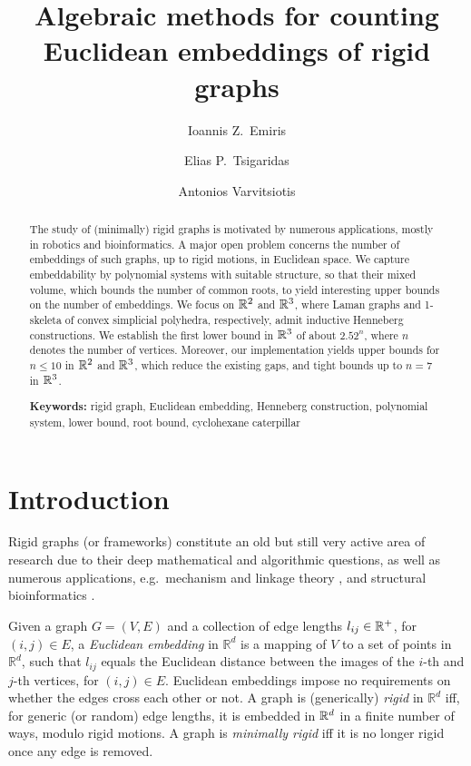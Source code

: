 \documentclass[envcountsame]{llncs}
\title{Algebraic methods for counting Euclidean embeddings of rigid graphs}
\author{Ioannis Z.\ Emiris \inst{1} \and  Elias P.\ Tsigaridas\inst{2} \and
  Antonios Varvitsiotis\inst{1} }
\institute{
  National and Kapodistrian University of Athens, Greece. \and INRIA     M\'editerran\'ee, Sophia-Antipolis, France.}
\begin{document}
\maketitle

\begin{abstract}
  The study of (minimally) rigid graphs is motivated by numerous applications,
  mostly in robotics and bioinformatics. 
  A major open problem concerns the number of embeddings of such graphs,
  up to rigid motions, in Euclidean space. We capture embeddability by polynomial systems
  with suitable structure, so that their mixed volume, which bounds the number 
  of common roots, to yield interesting upper bounds on the number of embeddings.
  We focus on ${\mathbb R}^2$ and ${\mathbb R}^3$, where Laman graphs and 1-skeleta of convex
simplicial polyhedra, respectively, admit inductive Henneberg
constructions. We establish the first  lower bound in ${\mathbb R}^3$ of about
$2.52^n$, where $n$ denotes the number of vertices. Moreover, our implementation
yields upper bounds for $n \le 10$ in ${\mathbb R}^2$ and ${\mathbb R}^3$, which reduce the existing gaps, and tight bounds  up to  $n=7$ in ${\mathbb R}^3$.



\medskip

{\bf Keywords:}
{rigid graph, Euclidean embedding, Henneberg construction,
polynomial system, lower bound, root bound, cyclohexane caterpillar}
\end{abstract} 


\section{Introduction}

Rigid graphs (or frameworks)
constitute an old but still very active area of research due to their deep
mathematical and algorithmic questions, as well as numerous
applications, e.g.\ mechanism and linkage theory \cite{WH07,WH07b},
and structural bioinformatics \cite{EM99,JRKT01,TD99}. 

Given a graph $G=(V,E)$ and a collection of edge lengths
$l_{ij}\in{\mathbb R}^{+}$, for $(i,j) \in E$, a {\em Euclidean embedding} in $\mathbb{R}^d$
is a mapping of $V$ to a set of points in $\mathbb{R}^d$, such that $l_{ij}$ equals
the Euclidean distance between the images of the $i$-th and $j$-th vertices,
for $(i,j) \in E$.
Euclidean embeddings impose no requirements on whether the edges cross each other or not.
A graph is (generically) {\em rigid} in $\mathbb{R}^d$ iff, for generic (or random)
edge lengths, it is embedded in ${\mathbb R}^d$ in a finite number of ways, modulo rigid motions.
A graph is {\em minimally rigid} iff it is no longer rigid once any edge is removed.
\end{document}
